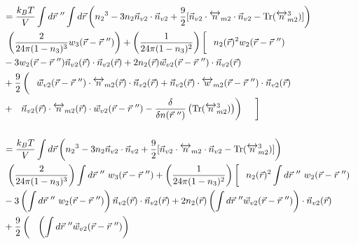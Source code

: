 \documentclass[double,12pt]{beavtex}
\begin{document}
\begin{align}   %
&=\frac{k_BT}{V}\int d\vec r~''\int d\vec r \left( {n_2}^3-3n_2
    \vec{n}_{v2}\cdot\vec{n}_{v2} 
     +\frac{9}{2}[\vec{n}_{v2}\cdot{\overleftrightarrow{n}_{m2}}\cdot{
     \vec{n}_{v2}}-\operatorname{Tr}({\overleftrightarrow{n}^3_{m2}})]
     \right) \nonumber\\
     &~\left(\frac{2}{24\pi(1-n_3)^3} w_3(\vec r-\vec r~'')
     \right) 
     + \left(\frac{1}{24\pi(1-n_3)^2}\right)\left[\color{white}\frac{1}{1}
     \color{black}n_2(\vec r)^2
     w_2(\vec r-\vec r~'') \color{white}\right] \nonumber\\
     &- 3w_2(\vec r-\vec r~'')\vec n_{v2}
     (\vec r) \cdot \vec n_{v2}(\vec r) + 2n_2(\vec r)
     \vec w_{v2}(\vec r-\vec r~'')\cdot \vec n_{v2}(\vec r) \nonumber \\
     &+\frac{9}{2}\left(\color{white}\frac{1}{1}\color{black}\vec w_{v2}
     (\vec r-\vec r~'')
     \cdot \overleftrightarrow n_{m2}(\vec r)\cdot \vec n_{v2}( \vec r)
     +\vec n_{v2}(\vec r)\cdot \overleftrightarrow w_{m2}(\vec r-\vec r~'')
     \cdot \vec n_{v2}( \vec r)\color{white}\right) \nonumber\\
     &+ \color{white}\left(\color{black}\vec n_{v2}( \vec r)\cdot 
     \overleftrightarrow n_{m2}(\vec r)
     \cdot \vec w_{v2}(\vec r-\vec r~'')-
     \frac{\delta}{\delta n(\vec r~'')}\left(\operatorname{Tr}
     ({\overleftrightarrow{n}^3_{m2}})\right)\right)
     \color{white}\left[\frac{1}{1}\color{black}\right]   \\ \nonumber \\
%
&=\frac{k_BT}{V}\int d\vec r \left( {n_2}^3-3n_2
    \vec{n}_{v2}\cdot\vec{n}_{v2} 
     +\frac{9}{2}[\vec{n}_{v2}\cdot{\overleftrightarrow{n}_{m2}}\cdot{
     \vec{n}_{v2}}-\operatorname{Tr}({\overleftrightarrow{n}^3_{m2}})]
     \right) \nonumber\\
     &~\left(\frac{2}{24\pi(1-n_3)^3}\right) \int d\vec r~''~ w_3(\vec r-\vec r~'')
    + \left(\frac{1}{24\pi(1-n_3)^2}\right)\left[\color{white}\frac{1}{1}
     \color{black}n_2(\vec r)^2
     \int d\vec r~''~ w_2(\vec r-\vec r~'') \color{white}\right] \nonumber\\
     &- 3\left(\int d\vec r~''~ w_2(\vec r-\vec r~'')\right)\vec n_{v2}(\vec r)
      \cdot \vec n_{v2}(\vec r)+ 2n_2(\vec r)\left(\int d\vec r~'' \vec 
     w_{v2}(\vec r-\vec r~'')\right)\cdot \vec n_{v2}(\vec r)\nonumber \\
     &+\frac{9}{2}\left(\color{white}\frac{1}{1}\color{black}\left(\int 
     d\vec r~'' \vec w_{v2}(\vec r-\vec r~'')\right)\color{white}\right)\color{black}

\end{align}
\end{document}
